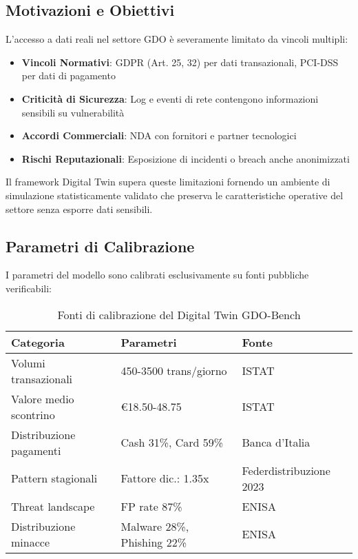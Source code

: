 \subsection{\texorpdfstring{Motivazioni e Obiettivi}{B.1.1 - Motivazioni e Obiettivi}}

L'accesso a dati reali nel settore GDO è severamente limitato da vincoli multipli:

\begin{itemize}
    \item \textbf{Vincoli Normativi}: GDPR (Art. 25, 32) per dati transazionali, PCI-DSS per dati di pagamento
    \item \textbf{Criticità di Sicurezza}: Log e eventi di rete contengono informazioni sensibili su vulnerabilità
    \item \textbf{Accordi Commerciali}: NDA con fornitori e partner tecnologici
    \item \textbf{Rischi Reputazionali}: Esposizione di incidenti o breach anche anonimizzati
\end{itemize}

Il framework Digital Twin supera queste limitazioni fornendo un ambiente di simulazione statisticamente validato che preserva le caratteristiche operative del settore senza esporre dati sensibili.

\subsection{\texorpdfstring{Parametri di Calibrazione}{B.1.2 - Parametri di Calibrazione}}

I parametri del modello sono calibrati esclusivamente su fonti pubbliche verificabili:

\begin{table}[h]
\centering
\caption{Fonti di calibrazione del Digital Twin GDO-Bench}
\label{tab:calibration-sources}
\begin{tabular}{@{}lll@{}}
\toprule
\textbf{Categoria} & \textbf{Parametri} & \textbf{Fonte} \\
\midrule
Volumi transazionali & 450-3500 trans/giorno & ISTAT\autocite{istat2023} \\
Valore medio scontrino & €18.50-48.75 & ISTAT\autocite{istat2023} \\
Distribuzione pagamenti & Cash 31\%, Card 59\% & Banca d'Italia\autocite{bancaditalia2023} \\
Pattern stagionali & Fattore dic.: 1.35x & Federdistribuzione 2023 \\
Threat landscape & FP rate 87\% & ENISA\autocite{enisa2023} \\
Distribuzione minacce & Malware 28\%, Phishing 22\% & ENISA\autocite{enisa2023} \\
\bottomrule
\end{tabular}
\end{table}

